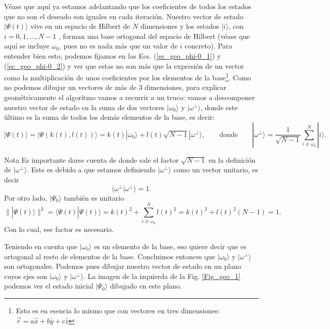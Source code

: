 \documentclass[a4paper,11pt]{article} %
\numberwithin{equation}{section}
\begin{document}
Véase que aquí ya estamos adelantando que los coeficientes de todos los estados que no son el deseado son iguales en cada iteración. Nuestro vector de estado $|\Psi(t) \rangle$ vive en un espacio de Hilbert de $N$ dimensiones y los estados $| i \rangle$, con $i=0,1,\dots,N-1$ , forman una base ortogonal del espacio de Hilbert (véase que aquí se incluye $\omega_0$, pues no es nada más que un valor de $i$ concreto). Para entender bien esto, podemos fijamos en las Ecs. (\ref{ec_geo_phi-0_1}) y (\ref{ec_geo_phi-0_2}) y ver que estas no son más que la expresión de un vector como la multiplicación de unos coeficientes por los elementos de la base\footnote{Esto es en esencia lo mismo que con vectores en tres dimensiones: $\vec{r} = a \hat{x} + b \hat{y} + c \hat{z}$}. Como no podemos dibujar un vectores de más de 3 dimensiones, para explicar geométricamente el algoritmo vamos a recurrir a un truco: vamos a descomponer nuestro vector de estado en la suma de dos vectores $|\omega_0 \rangle$ y $| \omega^{\perp} \rangle$, donde este último es la suma de todos los demás elementos de la base, es decir:
\begin{equation} \label{ec_geo_phi-j-s}
\boxed{|\Psi(t) \rangle = | \Psi (k(t),l(t)) \rangle = k(t) |\omega_0 \rangle + l(t) \sqrt{N-1} | \omega^{\perp}  \rangle}, \qquad \text{donde} \qquad \boxed{| \omega^{\perp}  \rangle = \frac{1}{\sqrt{N-1}}\sum_{i \neq \omega_0}^N  |i \rangle}.
\end{equation}

	\begin{mybox}{Nota}
	Es importante darse cuenta de donde sale el factor $\sqrt{N-1}$ en la definición de 
	$|\omega^{\perp}\rangle$. Este es debido a que estamos definiendo $|\omega^{\perp}\rangle$ 
	como un vector unitario, es decir 
	\begin{equation}
	\langle \omega^{\perp}| \omega^{\perp} \rangle = 1.
	\end{equation}
	Por otro lado, $|\Psi_0\rangle$ también es unitario
	\begin{equation}
	\parallel |\Psi(t) \rangle \parallel^2 = \langle \Psi(t) | \Psi(t) \rangle = 
	k(t)^2 + \sum_{i \neq \omega_0}^N l(t)^2 = k(t)^2 + l(t)^2 (N-1) = 1 .
	\end{equation}
	Con lo cual, ese factor es necesario.
	\end{mybox}

Teniendo en cuenta que $|\omega_0 \rangle$ es un elemento de la base, eso quiere decir que es ortogonal al resto de elementos de la base. Concluimos entonces que $|\omega_0 \rangle$ y $| \omega^{\perp} \rangle$ son ortogonales. Podemos pues dibujar nuestro vector de estado en un plano cuyos ejes son $|\omega_0 \rangle$ y $|\omega^{\perp} \rangle$. La imagen de la izquierda de la Fig. \ref{Fig_geo_1} podemos ver el estado inicial $| \Psi_0 \rangle$ dibujado en este plano. 
\end{document}
